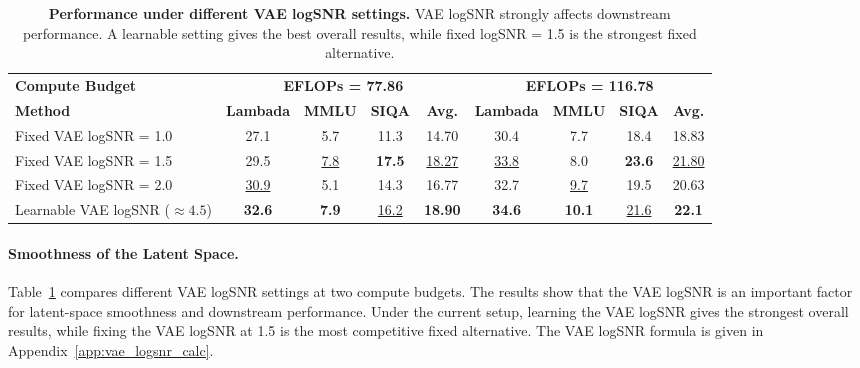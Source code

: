 \begin{table}[t]
    \centering
    \caption{\textbf{Performance under different VAE logSNR settings.} VAE logSNR strongly affects downstream performance. A learnable setting gives the best overall results, while fixed logSNR = 1.5 is the strongest fixed alternative.}
    \label{tab:fixlogsnr_two_budgets}
    \small
    \setlength{\tabcolsep}{5pt}
    \renewcommand{\arraystretch}{1.10}
    \begin{tabular*}{\textwidth}{@{\extracolsep{\fill}}lcccc@{\hspace{1.2em}}cccc}
        \toprule
        \textbf{Compute Budget}
        & \multicolumn{4}{c}{\textbf{EFLOPs = 77.86}}
        & \multicolumn{4}{c}{\textbf{EFLOPs = 116.78}} \\
        \cmidrule(r){1-1} \cmidrule(lr){2-5} \cmidrule(lr){6-9}
        \textbf{Method}
        & \textbf{Lambada} & \textbf{MMLU} & \textbf{SIQA} & \textbf{Avg.}
        & \textbf{Lambada} & \textbf{MMLU} & \textbf{SIQA} & \textbf{Avg.} \\
        \midrule
        Fixed VAE logSNR = 1.0 & 27.1 & 5.7 & 11.3 & 14.70 & 30.4 & 7.7 & 18.4 & 18.83 \\
        Fixed VAE logSNR = 1.5 & 29.5 & \underline{7.8} & \textbf{17.5} & \underline{18.27} & \underline{33.8} & 8.0 & \textbf{23.6} & \underline{21.80} \\
        Fixed VAE logSNR = 2.0 & \underline{30.9} & 5.1 & 14.3 & 16.77 & 32.7 & \underline{9.7} & 19.5 & 20.63 \\
        Learnable VAE logSNR ($\approx 4.5$) & \textbf{32.6} & \textbf{7.9} & \underline{16.2} & \textbf{18.90} & \textbf{34.6} & \textbf{10.1} & \underline{21.6} & \textbf{22.1} \\
        \bottomrule
    \end{tabular*}
\end{table}

\paragraph{Smoothness of the Latent Space. }
Table~\ref{tab:fixlogsnr_two_budgets} compares different VAE logSNR settings at two compute budgets. The results show that the VAE logSNR is an important factor for latent-space smoothness and downstream performance. Under the current setup, learning the VAE logSNR gives the strongest overall results, while fixing the VAE logSNR at 1.5 is the most competitive fixed alternative. The VAE logSNR formula is given in Appendix~\ref{app:vae_logsnr_calc}.

